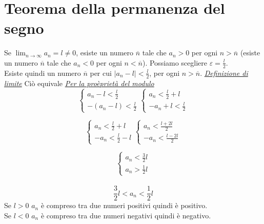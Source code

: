 \documentclass{article}
\begin{document}
\section{Teorema della permanenza del segno}
Se $\lim_{{n \to \infty}} a_n = l \neq 0$, esiste un numero $\overline{n}$ tale che $a_n>0$ per ogni $n>\overline{n}$ (esiste un numero $\overline{n}$ tale che $a_n<0$ per ogni $n<\overline{n}$).
Possiamo scegliere $\varepsilon=\frac{l}{2}$.\\
Esiste quindi un numero $\overline{n}$ per cui $|a_n-l| < \frac{l}{2}$, per ogni $n>\overline{n}$. \underline{\textit {Definizione di limite}} Ciò equivale \underline{\textit{Per la proèprietà del modulo}}
\begin{equation}
    \begin{cases}
        a_n - l < \frac{l}{2} \\
        -(a_n - l) < \frac{l}{2}
    \end{cases}
    \begin{cases}
        a_n < \frac{l}{2} + l \\
        -a_n + l < \frac{l}{2}
    \end{cases}
\end{equation}

\begin{equation}
    \begin{cases}
        a_n < \frac{l}{2} + l \\
        -a_n < \frac{l}{2} - l
    \end{cases}
    \begin{cases}
        a_n < \frac{l+2l}{2} \\
        -a_n < \frac{l-2l}{2}
    \end{cases}
\end{equation}

\begin{equation}
    \begin{cases}
        a_n < \frac{3}{2}l \\
        a_n > \frac{1}{2}l
    \end{cases}
\end{equation}
\\
$$\frac{3}{2}l < a_n < \frac{1}{2}l$$
Se $l>0$ $a_n$ è compreso tra due numeri positivi quindi è positivo.\\
Se $l<0$ $a_n$ è compreso tra due numeri negativi quindi è negativo.
\end{document}

